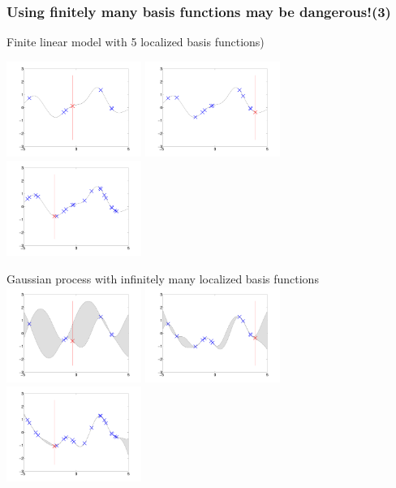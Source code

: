 \begin{frame}
\frametitle{\!\!\!Using finitely many basis functions may be dangerous!(3)}

Finite linear model with 5 localized basis functions)

\includegraphics[width=0.33\textwidth]{seq_linear_M7.pdf}
\includegraphics[width=0.33\textwidth]{seq_linear_M12.pdf}
\includegraphics[width=0.33\textwidth]{seq_linear_M20.pdf}

Gaussian process with infinitely many localized basis functions
\includegraphics[width=0.33\textwidth]{seq_fullGP_M7.pdf}
\includegraphics[width=0.33\textwidth]{seq_fullGP_M12.pdf}
\includegraphics[width=0.33\textwidth]{seq_fullGP_M20.pdf}
\end{frame}


